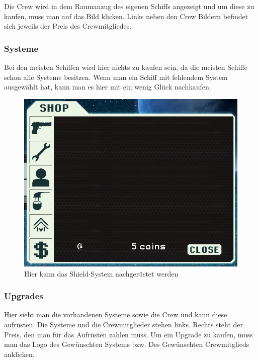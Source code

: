 \documentclass[fontsize=12pt,paper=a4,twoside]{scrartcl}
\begin{document}
Die Crew wird in dem Raumanzug des eigenen Schiffs angezeigt und um diese zu kaufen, muss man auf das Bild klicken. Links neben den Crew Bildern befindet sich jeweils der Preis des Crewmitgliedes. 

\subsubsection{Systeme}

Bei den meisten Schiffen wird hier nichts zu kaufen sein, da die meisten Schiffe schon alle Systeme besitzen. Wenn man ein Schiff mit fehlendem System ausgewählt hat, kann man es hier mit ein wenig Glück nachkaufen. 

\begin{figure}[H]
\centering
\includegraphics[width=1\linewidth]{DasSpiel/Shop/sys.png}
\caption{Hier kann das Shield-System nachgerüstet werden}
\end{figure}

\subsubsection{Upgrades}

Hier sieht man die vorhandenen Systeme sowie die Crew und kann diese aufrüsten. Die Systeme und die Crewmitglieder stehen links. Rechts steht der Preis, den man für das Aufrüsten zahlen muss. Um ein Upgrade zu kaufen, muss man das Logo des Gewünschten Systems bzw. Des Gewünschten Crewmitglieds anklicken. 
\end{document}
